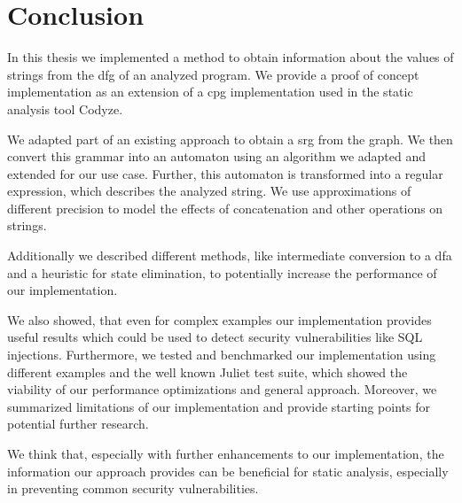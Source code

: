 \chapter{Conclusion}\label{chapter:Conclusion}

In this thesis we implemented a method to obtain information about the values of strings from the \acl{dfg} of an analyzed program. We provide a proof of concept implementation as an extension of a \acl{cpg} implementation used in the static analysis tool Codyze.

We adapted part of an existing approach to obtain a \acl{srg} from the graph. We then convert this grammar into an automaton using an algorithm we adapted and extended for our use case.
Further, this automaton is transformed into a regular expression, which describes the analyzed string. We use approximations of different precision to model the effects of concatenation and other operations on strings.

Additionally we described different methods, like intermediate conversion to a \ac{dfa} and a heuristic for state elimination, to potentially increase the performance of our implementation.

We also showed, that even for complex examples our implementation provides useful results which could be used to detect security vulnerabilities like SQL injections.
Furthermore, we tested and benchmarked our implementation using different examples and the well known Juliet test suite, which showed the viability of our performance optimizations and general approach.
Moreover, we summarized limitations of our implementation and provide starting points for potential further research.

We think that, especially with further enhancements to our implementation, the information our approach provides can be beneficial for static analysis, especially in preventing common security vulnerabilities.

\begin{comment}	
Summarize your main contributions and observations. Further research directions?

$\leq 1$ page
content...
\end{comment}